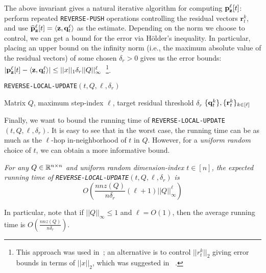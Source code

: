 The above invariant gives a natural iterative algorithm for computing ${\mathbf{p}}_\mathbf{z}^{\ell}[t]$: perform repeated \texttt{REVERSE-PUSH} operations controlling the residual vectors $\mathbf{r}_t^k$, and use $\widehat{\mathbf{p}}_\mathbf{z}^{\ell}[t] = \langle\mathbf{z},\mathbf{q}_t^{\ell}\rangle$ as the estimate. 
Depending on the norm we choose to control, we can get a bound for the error via H{\"o}lder's inequality.
In particular, placing an upper bound on the infinity norm (i.e., the maximum absolute value of the residual vectors) of some chosen $\delta_r>0$ gives us the error bounds: $|{\mathbf{p}}_\mathbf{z}^{\ell}[t] - \langle\mathbf{z},\mathbf{q}_t^{\ell}\rangle|\leq ||x||_1\delta_r||Q||_{\infty}^{\ell}$~\footnote{This approach was used in~\cite{andersen2007local,Lofgren2014,banerjee2015fast}; an alternative is to control $||r_t^k||_2$ giving error bounds in terms of $||x||_2$, which was suggested in ~\cite{lee2014asynchronous}.}.

\begin{algorithm}[!ht]
\caption{\texttt{REVERSE-LOCAL-UPDATE}$(t,Q, \ell, \delta_r)$}
\label{alg:rwork}
\begin{algorithmic}[1]
\REQUIRE Matrix $Q$, maximum step-index $\ell$, target residual threshold $\delta_r$
\ENDWHILE
\ENDFOR
\RETURN $\{\mathbf{q}^{k}_t\}, \{\mathbf{r}^{k}_t\}_{k \in[\ell]}$
\end{algorithmic}
\end{algorithm}    

Finally, we want to bound the running time of \texttt{REVERSE-LOCAL-UPDATE}$(t,Q,\ell,\delta_r)$. 
It is easy to see that in the worst case, the running time can be as much as the $\ell$-hop in-neighborhood of $t$ in $Q$. 
However, for a \emph{uniform random} choice of $t$, we can obtain a more informative bound. 

\begin{lemma}
\label{lem:pushruntime}
\emph{For any $Q\in\mathbb{R}^{n\times n}$ and uniform random dimension-index $t\in[n]$, the expected running time of \texttt{REVERSE-LOCAL-UPDATE}$(t,Q,\ell,\delta_r)$ is 
$$O\left(\frac{nnz(Q)}{n\delta_r}(\ell+1)||Q||_{\infty}^{\ell}\right)$$ 
}
\end{lemma}

In particular, note that if $||Q||_{\infty}\leq 1$ and $\ell=O(1)$, then the average running time is $O\left(\frac{nnz(Q)}{n\delta_r}\right)$.

